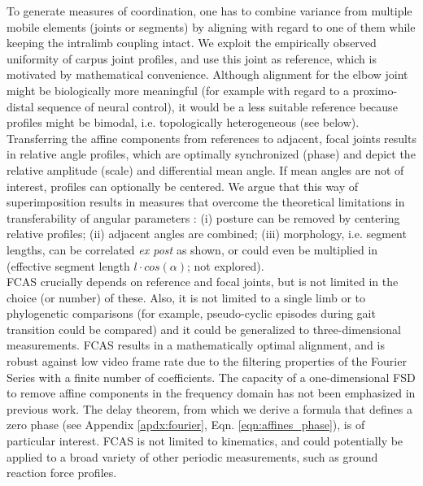 \documentclass[10pt, a4paper]{article}
\begin{document}
To generate measures of coordination, one has to combine variance from multiple mobile elements (joints or segments) by aligning with regard to one of them while keeping the intralimb coupling intact. 
We exploit the empirically observed uniformity of carpus joint profiles, and use this joint as reference, which is motivated by mathematical convenience. 
Although alignment for the elbow joint might be biologically more meaningful (for example with regard to a proximo-distal sequence of neural control), it would be a less suitable reference because profiles might be bimodal, i.e. topologically heterogeneous (see below). 
Transferring the affine components from references to adjacent, focal joints results in relative angle profiles, which are optimally synchronized (phase) and depict the relative amplitude (scale) and differential mean angle. 
If mean angles are not of interest, profiles can optionally be centered. 
We argue that this way of superimposition results in measures that overcome the theoretical limitations in transferability of angular parameters \citep{Gatesy2011}: (i) posture can be removed by centering relative profiles; (ii) adjacent angles are combined; (iii) morphology, i.e. segment lengths, can be correlated \textit{ex post} as shown, or could even be multiplied in (effective segment length $l\cdot cos\left(\alpha\right)$; not explored). 
\\FCAS crucially depends on reference and focal joints, but is not limited in the choice (or number) of these. 
Also, it is not limited to a single limb or to phylogenetic comparisons (for example, pseudo-cyclic episodes during gait transition could be compared) and it could be generalized to three-dimensional measurements. 
FCAS results in a mathematically optimal alignment, and is robust against low video frame rate due to the filtering properties of the Fourier Series with a finite number of coefficients. 
The capacity of a one-dimensional FSD to remove affine components in the frequency domain has not been emphasized in previous work. 
The delay theorem, from which we derive a formula that defines a zero phase (see Appendix \ref{apdx:fourier}, Eqn. \ref{eqn:affines_phase}), is of particular interest.  
FCAS is not limited to kinematics, and could potentially be applied to a broad variety of other periodic measurements, such as ground reaction force profiles. 
\end{document}
